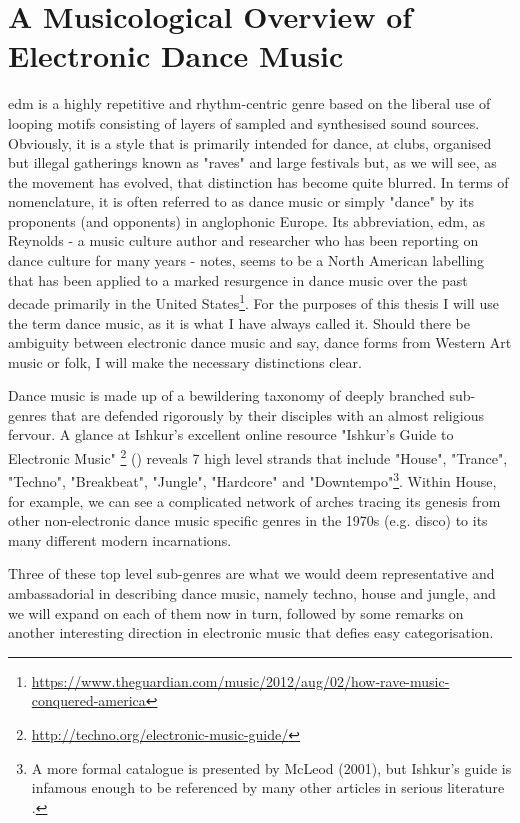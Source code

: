 \chapter{A Musicological Overview of Electronic Dance Music}
\label{chap:dancemusic}

\acrfull{edm} is a highly repetitive and rhythm-centric genre based on the liberal use of looping motifs consisting of layers of sampled and synthesised sound sources. Obviously, it is a style that is primarily intended for dance, at clubs, organised but illegal gatherings known as "raves" and large festivals but, as we will see, as the movement has evolved, that distinction has become quite blurred. In terms of nomenclature, it is often referred to as dance music or simply "dance" by its proponents (and opponents) in anglophonic Europe. Its abbreviation, \acrshort{edm}, as Reynolds - a music culture author and researcher who has been reporting on dance culture for many years - notes, seems to be a North American labelling that has been applied to a marked resurgence in dance music over the past decade primarily in the United States\footnote{\url{https://www.theguardian.com/music/2012/aug/02/how-rave-music-conquered-america}}. For the purposes of this thesis I will use the term dance music, as it is what I have always called it. Should there be ambiguity between electronic dance music and say, dance forms from Western Art music or folk, I will make the necessary distinctions clear.

Dance music is made up of a bewildering taxonomy of deeply branched sub-genres that are defended rigorously by their disciples with an almost religious fervour. A glance at Ishkur's excellent online resource "Ishkur's Guide to Electronic Music" \footnote{\url{http://techno.org/electronic-music-guide/}}
() reveals 7 high level strands that include "House", "Trance", "Techno", "Breakbeat", "Jungle", "Hardcore" and "Downtempo"\footnote{A more formal catalogue is presented by McLeod (2001), but Ishkur’s guide is infamous enough to be referenced by many other articles in serious literature
\citep{leimeister2014rhythmic, Pampalk2005}.}. Within House, for example, we can see a complicated network of arches tracing its genesis from other non-electronic dance music specific genres in the 1970s (e.g. disco) to its many different modern incarnations. 

Three of these top level sub-genres are what we would deem representative and ambassadorial in describing dance music, namely techno, house and jungle, and we will expand on each of them now in turn, followed by some remarks on another interesting direction in electronic music that defies easy categorisation.

